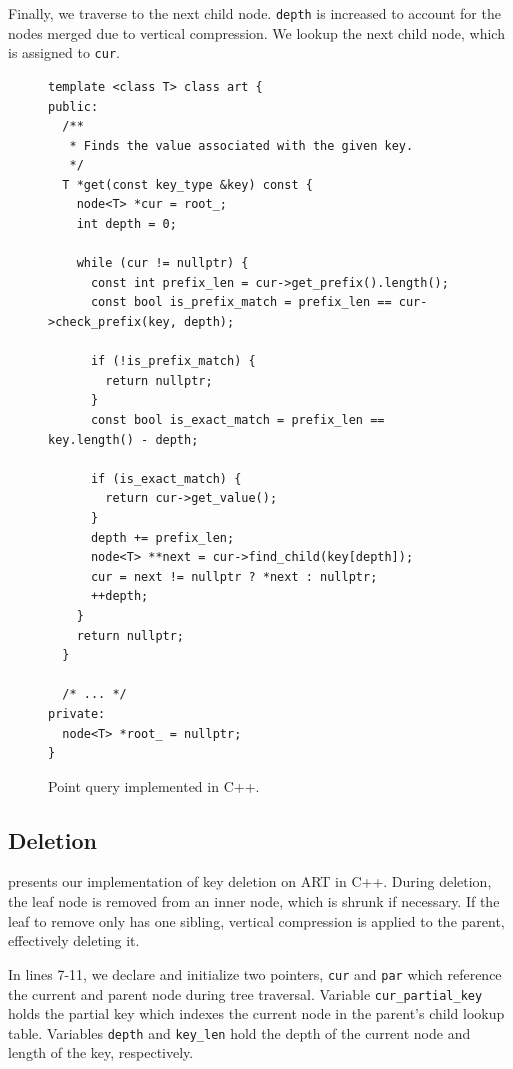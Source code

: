 \documentclass[abstracton,12pt]{scrartcl}
\theoremstyle{definition}
\begin{document}
Finally, we traverse to the next child node. \texttt{depth} is increased to
account for the nodes merged due to vertical compression.
We lookup the next child node, which is assigned to \texttt{cur}.

\begin{figure}[H]
  \begin{verbatim}
template <class T> class art {
public:
  /**
   * Finds the value associated with the given key.
   */
  T *get(const key_type &key) const {
    node<T> *cur = root_;
    int depth = 0;

    while (cur != nullptr) {
      const int prefix_len = cur->get_prefix().length();
      const bool is_prefix_match = prefix_len == cur->check_prefix(key, depth);

      if (!is_prefix_match) {
        return nullptr;
      }
      const bool is_exact_match = prefix_len == key.length() - depth;

      if (is_exact_match) {
        return cur->get_value();
      }
      depth += prefix_len;
      node<T> **next = cur->find_child(key[depth]);
      cur = next != nullptr ? *next : nullptr;
      ++depth;
    }
    return nullptr;
  }

  /* ... */
private:
  node<T> *root_ = nullptr;
}
  \end{verbatim}
  \caption{Point query implemented in C++.}
  \label{algo:point-query}
\end{figure}

\subsection{Deletion}
\label{sec:deletion}

 presents our implementation of key deletion on ART in C++.
During deletion, the leaf node is removed from an inner node, which is shrunk
if necessary. If the leaf to remove only has one sibling, vertical
compression is applied to the parent, effectively deleting it.

In lines 7-11, we declare and initialize two pointers, \texttt{cur} and
\texttt{par} which reference the current and parent node during tree traversal.
Variable \texttt{cur\_partial\_key} holds the partial key which indexes the
current node in the parent's child lookup table.
Variables \texttt{depth} and \texttt{key\_len} hold the depth of the current
node and length of the key, respectively.
\end{document}
